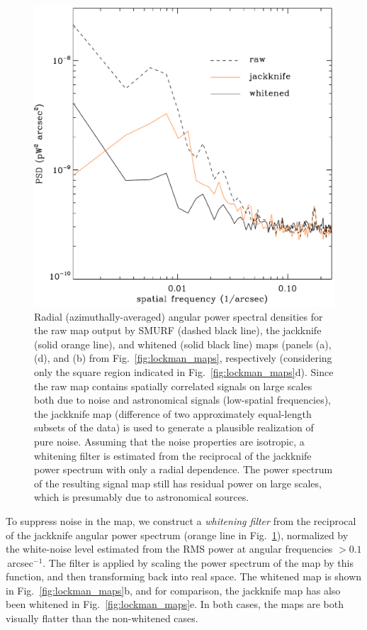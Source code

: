 \documentclass[useAMS,usenatbib,nofootinbib]{mn2e}
\begin{document}
\begin{figure}
\centering
\includegraphics[width=\linewidth]{lockman_pspec.pdf}
\caption{Radial (azimuthally-averaged) angular power spectral
  densities for the raw map output by SMURF (dashed black line), the
  jackknife (solid orange line), and whitened (solid black line) maps
  (panels (a), (d), and (b) from Fig.~\ref{fig:lockman_maps},
  respectively (considering only the square region indicated in
  Fig.~\ref{fig:lockman_maps}d). Since the raw map contains spatially
  correlated signals on large scales both due to noise and
  astronomical signals (low-spatial frequencies), the jackknife map
  (difference of two approximately equal-length subsets of the data)
  is used to generate a plausible realization of pure noise. Assuming
  that the noise properties are isotropic, a whitening filter is
  estimated from the reciprocal of the jackknife power spectrum with
  only a radial dependence. The power spectrum of the resulting signal
  map still has residual power on large scales, which is presumably
  due to astronomical sources.}
\label{fig:lockman_pspec}
\end{figure}

To suppress noise in the map, we construct a \emph{whitening filter}
from the reciprocal of the jackknife angular power spectrum (orange
line in Fig.~\ref{fig:lockman_pspec}), normalized by the white-noise
level estimated from the RMS power at angular frequencies $>
0.1$\,arcsec$^{-1}$. The filter is applied by scaling the power
spectrum of the map by this function, and then transforming back into
real space. The whitened map is shown in Fig.~\ref{fig:lockman_maps}b,
and for comparison, the jackknife map has also been whitened in
Fig.~\ref{fig:lockman_maps}e. In both cases, the maps are both
visually flatter than the non-whitened cases.
\end{document}
